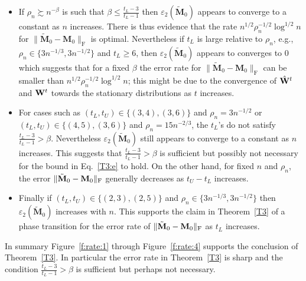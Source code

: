 \documentclass[10pt,journal,compsoc]{IEEEtran}
\newcommand{\M}[1]{{{\mathbf{\MakeUppercase{#1}}}}}
\newcommand{\F}{\mathrm{F}}
\numberwithin{equation}{section}
\begin{document}
\begin{itemize}
\item If $\rho_n \succsim n^{-\beta}$ is such that $\beta \leq \frac{t_L
  -3}{t_L-1}$ then $\varepsilon_2(\tilde{\mathbf{M}}_0)$ appears to converge to a constant as $n$ increases. There
  is thus evidence that the rate
  $n^{1/2}\rho_n^{-1/2} \log^{1/2}{n}$  for $\|\tilde{\mathbf{M}}_0 - \mathbf{M}_0\|_{\F}$ is optimal. 
  Nevertheless if $t_L$ is large relative to $\rho_n$, e.g.,
 $\rho_n \in \{3n^{-1/3}, 3n^{-1/2}\}$ and $t_L \geq 6$, then
  $\varepsilon_2(\tilde{\mathbf{M}}_0)$ appears to converges to $0$ which suggests that for a fixed $\beta$ the error rate for $\|\tilde{\mathbf{M}}_0 - \mathbf{M}_0\|_{\F}$ can be smaller than $n^{1/2}\rho_n^{-1/2} \log^{1/2}{n}$; this might be due to the convergence of $\hat{\M W}^{t}$ and $\M W^{t}$ towards the stationary distributions as $t$ increases. 
\item For cases such as $(t_L,t_U) \in \{(3,4), (3,6)\}$ and $\rho_n = 3n^{-1/2}$
  or $(t_L,t_U) \in \{(4,5), (3,6)\}$ and $\rho_n = 15n^{-2/3}$, 
  the $t_L$'s do not satisfy $\tfrac{t_L
  -3}{t_L-1} > \beta$. Nevertheless $\varepsilon_2(\tilde{\mathbf{M}}_0)$ still appears to converge to a constant as $n$ increases. This suggests that $\tfrac{t_L
  -3}{t_L-1} > \beta$ is sufficient but possibly not necessary for
  the bound in Eq.~\eqref{T3:e} to hold. On the other hand,
  for fixed $n$ and $\rho_n$, the error $\|\tilde{\mathbf{M}}_0 - \M M_0\|_{\F}$ generally decreases as $t_U - t_L$ increases. 
  \item Finally if $(t_L, t_U) \in \{(2,3), (2,5)\}$ and $\rho_n
\in \{3n^{-1/3}, 3n^{-1/2}\}$ then $\varepsilon_2(\tilde{\mathbf{M}}_0)$ increases with $n$. This supports the claim in Theorem~\ref{T3} of a phase transition for the error rate of $\|\tilde{\M M}_0 - \M M_0\|_{\F}$ as $t_L$ increases.
\end{itemize}
In summary Figure~\ref{f:rate:1} through Figure~\ref{f:rate:4} supports the conclusion of Theorem~\ref{T3}. In particular the error
rate in Theorem~\ref{T3} is sharp and the condition $\tfrac{t_L - 3}{t_L - 1}>\beta$ 
is sufficient but perhaps not necessary. 
\end{document}
